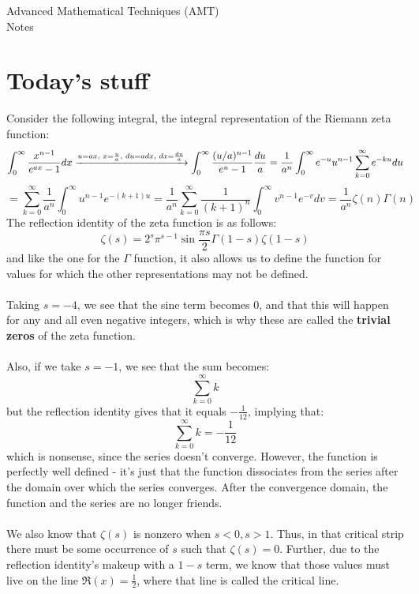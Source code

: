 \documentclass{article}
\begin{document}
\thispagestyle{fancy}
\begin{center}\LARGE{Advanced Mathematical Techniques (AMT) \\ Notes}\end{center}
\section{Today's stuff}
Consider the following integral, the integral representation of the Riemann zeta function:
\[\int_{0}^{\infty} \frac{x^{n-1}}{e^{ax}-1}dx \xrightarrow{u = ax,\hspace{1mm} x = \frac u a,\hspace{1mm} du = adx,\hspace{1mm} dx = \frac{du} a} \int_{0}^{\infty} \frac{(u/a)^{n-1}}{e^u - 1} \frac{du}{a} = \frac{1}{a^n}\int_{0}^{\infty}e^{-u}u^{n-1}\sum_{k=0}^{\infty} e^{-ku}du\]
\[ = \sum_{k=0}^{\infty} \frac{1}{a^n}\int_{0}^{\infty} u^{n-1}e^{-(k+1)u} = \frac{1}{a^n}\sum_{k=0}^{\infty} \frac{1}{(k+1)^n}\int_{0}^{\infty}v^{n-1}e^{-v}dv = \boxed{\frac{1}{a^n}\zeta(n)\Gamma(n)}\]
The reflection identity of the zeta function is as follows:
\[\zeta(s) = 2^s \pi^{s-1} \sin \frac{\pi s}{2} \Gamma(1-s) \zeta(1-s)\]
and like the one for the $\Gamma$ function, it also allows us to define the function for values for which the other representations may not be defined.
\\
\\
Taking $s=-4$, we see that the sine term becomes 0, and that this will happen for any and all even negative integers, which is why these are called the \textbf{trivial zeros} of the zeta function. 
\\ \\
Also, if we take $s=-1$, we see that the sum becomes:
\[\sum_{k=0}^{\infty}k\]
but the reflection identity gives that it equals $-\frac 1 {12}$, implying that:
\[\sum_{k=0}^{\infty}k = -\frac 1 {12}\]
which is nonsense, since the series doesn't converge. However, the function is perfectly well defined - it's just that the function dissociates from the series after
the domain over which the series converges. After the convergence domain, the function and the series are no longer friends.
\\ \\
We also know that $\zeta(s)$ is nonzero when $s<0, s>1$. Thus, in that critical strip there must be some occurrence of $s$ such that $\zeta(s) = 0$. Further, due to the
reflection identity's makeup with a $1-s$ term, we know that those values must live on the line $\Re(x)=\frac 1 2$, where that line is called the critical line.
\end{document}
